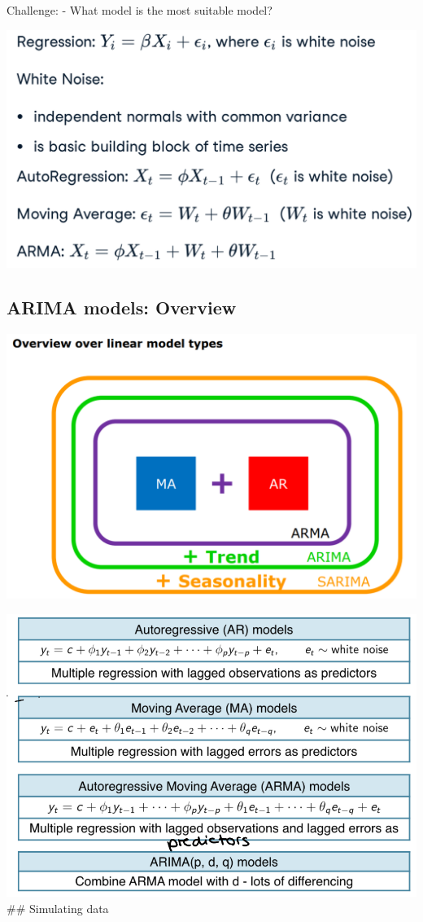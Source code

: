 \documentclass[
]{article}
\begin{document}
Challenge: - What model is the most suitable model?

\includegraphics[width=1\linewidth]{model}

\hypertarget{arima-models-overview}{%
\subsection{ARIMA models: Overview}\label{arima-models-overview}}

\includegraphics[width=0.5\linewidth]{over}

\includegraphics[width=1\linewidth]{arima} \#\# Simulating data
\end{document}
